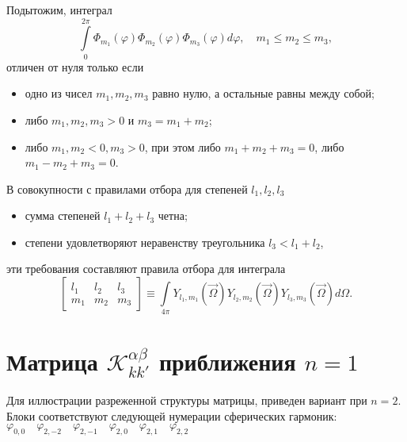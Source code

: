 Подытожим, интеграл 
\[
\int\limits_{0}^{2\pi} \Phi_{m_1}(\varphi)\Phi_{m_2}(\varphi)\Phi_{m_3}(\varphi) d\varphi, \quad 
m_1 \leq m_2 \leq m_3,
\]
отличен от нуля только если
\begin{itemize}
\item одно из чисел $m_1, m_2, m_3$ равно нулю, а остальные равны между собой;
\item либо $m_1, m_2, m_3 > 0$ и $m_3 = m_1 + m_2$;
\item либо $m_1, m_2 < 0, m_3 > 0$, при этом либо $m_1 + m_2 + m_3 = 0$, либо $m_1 - m_2 + m_3 = 0$.
\end{itemize}
В совокупности с правилами отбора для степеней $l_1, l_2, l_3$
\begin{itemize}
\item сумма степеней $l_1 + l_2 + l_3$ четна;
\item степени удовлетворяют неравенству треугольника $l_3 < l_1 + l_2$,
\end{itemize}
эти требования составляют правила отбора для интеграла
\[
\begin{bmatrix}
l_1 & l_2 & l_3\\
m_1 & m_2 & m_3
\end{bmatrix} \equiv
\int\limits_{4\pi}
Y_{l_1,m_1}(\vec \Omega)
Y_{l_2,m_2}(\vec \Omega)
Y_{l_3,m_3}(\vec \Omega)
d\Omega.
\]

\section{Матрица
\texorpdfstring{$\mathscr{K}^{\alpha\beta}_{kk'}$}{K^ab\_kk'}
приближения \texorpdfstring{$n = 1$}{n = 1}}

Для иллюстрации разреженной структуры матрицы, приведен вариант при $n = 2$. Блоки соответствуют следующей нумерации сферических гармоник: 
$\varphi_{0,0}\quad \varphi_{2,-2}\quad \varphi_{2,-1}\quad \varphi_{2,0}\quad \varphi_{2,1}\quad \varphi_{2,2}$

